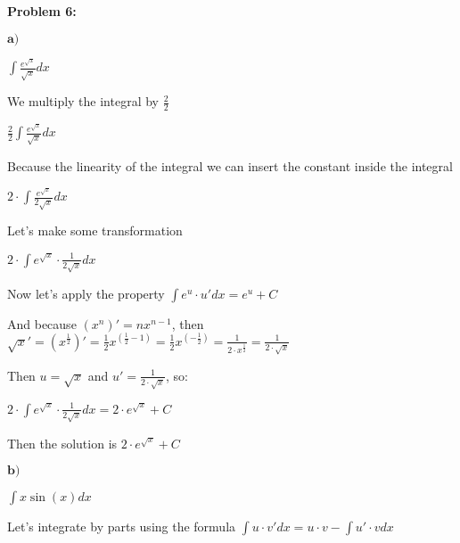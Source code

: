 \textbf{Problem 6:}

\singlespacing

$\textbf{a)}$

\singlespacing

$\int \frac{e^{\sqrt{x}}}{\sqrt{x}}dx$

\singlespacing

We multiply the integral by $\frac{2}{2}$

\singlespacing

$\frac{2}{2}\int \frac{e^{\sqrt{x}}}{\sqrt{x}}dx$

\singlespacing

Because the linearity of the integral we can insert the constant inside the integral

\singlespacing

$2\cdot\int \frac{e^{\sqrt{x}}}{2\sqrt{x}}dx$

\singlespacing

Let's make some transformation

\singlespacing

$2\cdot\int e^{\sqrt{x}}\cdot \frac{1}{2\sqrt{x}}dx$

\singlespacing

Now let's apply the property $\int e^u \cdot u'dx  = e^u + C$

\singlespacing

And because $(x^n)' = nx^{n-1}$, then $\sqrt{x}' = (x^\frac{1}{2})' =
    \frac{1}{2}x^{(\frac{1}{2}-1)}  = \frac{1}{2}x^{(-\frac{1}{2})}= \frac{1}{2\cdot x^\frac{1}{2}}
    = \frac{1}{2\cdot \sqrt{x}}$

\singlespacing

Then $u = \sqrt{x}$ and $u' = \frac{1}{2\cdot \sqrt{x}}$, so:

\singlespacing

$2\cdot\int e^{\sqrt{x}}\cdot \frac{1}{2\sqrt{x}}dx = 2\cdot e^{\sqrt{x}} + C$

\singlespacing

Then the solution is $2\cdot e^{\sqrt{x}} + C$

\singlespacing
\singlespacing
\singlespacing

$\textbf{b)}$

\singlespacing

$\int x\sin{(x) }dx$

\singlespacing

Let's integrate by parts using the formula $\int u\cdot v'dx = u\cdot v - \int u'\cdot vdx$

\singlespacing


